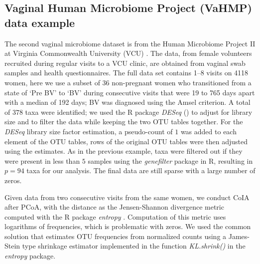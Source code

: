 \documentclass[doublespacing]{bmcart}
\begin{document}
\subsection*{Vaginal Human Microbiome Project (VaHMP) data example}

The second vaginal microbiome dataset is from the Human Microbiome Project II at Virginia Commonwealth University (VCU) \cite{Fettweis}. The data, from female volunteers recruited during regular visits to a VCU clinic, are obtained from vaginal swab samples and health questionnaires.  The full data set contains 1--8 visits on 4118 women, here we use a subset of 36 non-pregnant women who transitioned from a state of `Pre BV' to `BV' during consecutive visits that were 19 to 765 days apart with a median of 192 days; BV was diagnosed using the Amsel criterion. A total of $378$ taxa were identified; we used the R package \textit{DESeq} (\cite{Hausser}) to adjust for library size and to filter the data while keeping the two OTU tables together.  For the \textit{DESeq} library size factor estimation, a pseudo-count of $1$ was added to each element of the OTU tables, rows of the original OTU tables were then adjusted using the estimates. As in the previous example, taxa were filtered out if they were present in less than $5$ samples using the {\it genefilter} package in R, resulting in $p=94$ taxa for our analysis.  The final data are still sparse with a large number of zeros.

Given data from two consecutive visits from the same women, we conduct CoIA after PCoA, with the distance as the Jensen-Shannon divergence metric \cite{Lin} computed with the R package {\it entropy} \cite{Hausser}. Computation of this metric uses logarithms of frequencies, which is problematic with zeros. We used the common solution that estimates OTU frequencies from normalized counts using a James-Stein type shrinkage estimator implemented in the function {\it KL.shrink()} in the {\it entropy} package. 
\end{document}
